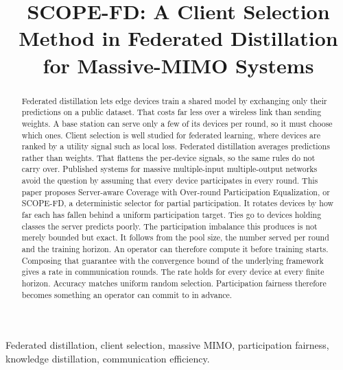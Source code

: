 \documentclass[journal]{IEEEtran}
\newcommand{\rev}[1]{{\color{blue}#1}}
\begin{document}
\title{SCOPE-FD: A Client Selection Method in Federated Distillation for Massive-MIMO Systems}

\author{
}

\maketitle

\begin{abstract}
\rev{Federated distillation lets edge devices train a shared model by exchanging only their predictions on a public dataset. That costs far less over a wireless link than sending weights. A base station can serve only a few of its devices per round, so it must choose which ones. Client selection is well studied for federated learning, where devices are ranked by a utility signal such as local loss. Federated distillation averages predictions rather than weights. That flattens the per-device signals, so the same rules do not carry over. Published systems for massive multiple-input multiple-output networks avoid the question by assuming that every device participates in every round. This paper proposes Server-aware Coverage with Over-round Participation Equalization, or SCOPE-FD, a deterministic selector for partial participation. It rotates devices by how far each has fallen behind a uniform participation target. Ties go to devices holding classes the server predicts poorly. The participation imbalance this produces is not merely bounded but exact. It follows from the pool size, the number served per round and the training horizon. An operator can therefore compute it before training starts. Composing that guarantee with the convergence bound of the underlying framework gives a rate in communication rounds. The rate holds for every device at every finite horizon. Accuracy matches uniform random selection. Participation fairness therefore becomes something an operator can commit to in advance.}
\end{abstract}

\begin{IEEEkeywords}
Federated distillation, client selection, massive MIMO, participation fairness, knowledge distillation, communication efficiency.
\end{IEEEkeywords}
\end{document}
